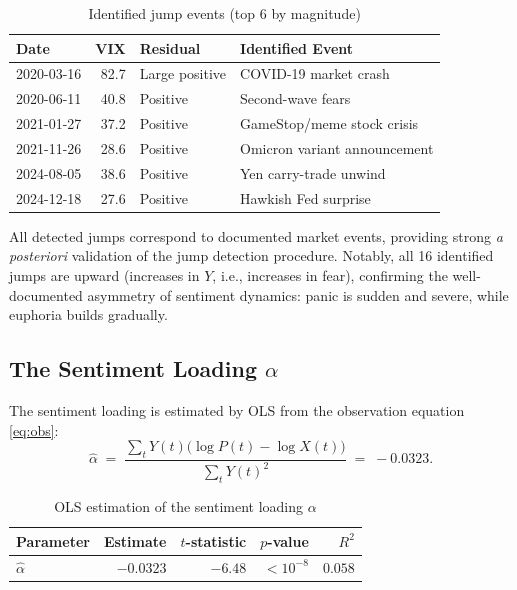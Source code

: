 \documentclass[12pt,a4paper]{article}
\theoremstyle{definition}
\theoremstyle{remark}
\begin{document}
\begin{table}[H]
  \centering
  \caption{Identified jump events (top 6 by magnitude)}
  \label{tab:jumps}
  \begin{tabular}{lrll}
    \toprule
    Date & VIX & Residual & Identified Event \\
    \midrule
    2020-03-16 & 82.7 & Large positive & COVID-19 market crash \\
    2020-06-11 & 40.8 & Positive & Second-wave fears \\
    2021-01-27 & 37.2 & Positive & GameStop/meme stock crisis \\
    2021-11-26 & 28.6 & Positive & Omicron variant announcement \\
    2024-08-05 & 38.6 & Positive & Yen carry-trade unwind \\
    2024-12-18 & 27.6 & Positive & Hawkish Fed surprise \\
    \bottomrule
  \end{tabular}
\end{table}

All detected jumps correspond to documented market events, providing
strong \emph{a posteriori} validation of the jump detection procedure.
Notably, all 16 identified jumps are upward (increases in $Y$, i.e.,
increases in fear), confirming the well-documented asymmetry of
sentiment dynamics: panic is sudden and severe, while euphoria builds
gradually.

\subsection{The Sentiment Loading $\alpha$}

The sentiment loading is estimated by OLS from the observation
equation \eqref{eq:obs}:
\begin{equation}
  \hat{\alpha} \;=\;
  \frac{\sum_t Y(t)\bigl(\log P(t) - \log X(t)\bigr)}{\sum_t Y(t)^2}
  \;=\; -0.0323.
\end{equation}

\begin{table}[H]
  \centering
  \caption{OLS estimation of the sentiment loading $\alpha$}
  \label{tab:alpha}
  \begin{tabular}{lrrrr}
    \toprule
    Parameter & Estimate & $t$-statistic & $p$-value & $R^2$ \\
    \midrule
    $\hat{\alpha}$ & $-0.0323$ & $-6.48$ & $< 10^{-8}$ & $0.058$ \\
    \bottomrule
  \end{tabular}
\end{table}
\end{document}
